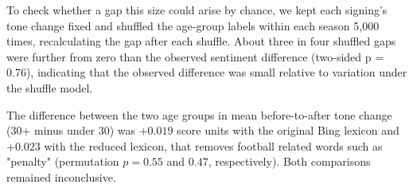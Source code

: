 To check whether a gap this size could arise by chance, we kept each signing's tone change fixed and shuffled the age-group labels within each season 5,000 times, recalculating the gap after each shuffle. About three in four shuffled gaps were further from zero than the observed sentiment difference (two-sided p = 0.76), indicating that the observed difference was small relative to variation under the shuffle model.

The difference between the two age groups in mean before-to-after tone change (30+ minus under 30) was $+0.019$ score units with the original Bing lexicon and $+0.023$ with the reduced lexicon, that removes football related words such as "penalty" (permutation $p = 0.55$ and $0.47$, respectively). Both comparisons remained inconclusive.

